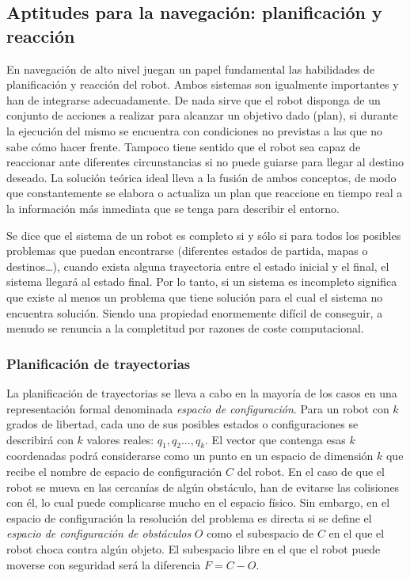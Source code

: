 \subsection{Aptitudes para la navegación: planificación y\\ reacción}
En navegación de alto nivel juegan un papel fundamental las habilidades de planificación y reacción del robot. Ambos sistemas son igualmente importantes y han de integrarse adecuadamente. De nada sirve que el robot disponga de un conjunto de acciones a realizar para alcanzar un objetivo dado (plan), si durante la ejecución del mismo se encuentra con condiciones no previstas a las que no sabe cómo hacer frente. Tampoco tiene sentido que el robot sea capaz de reaccionar ante diferentes circunstancias si no puede guiarse para llegar al destino deseado. La solución teórica ideal lleva a la fusión de ambos conceptos, de modo que constantemente se elabora o actualiza un plan que reaccione en tiempo real a la información más inmediata que se tenga para describir el entorno.

Se dice que el sistema de un robot es completo si y sólo si para todos los posibles problemas que puedan encontrarse (diferentes estados de partida, mapas o destinos\ldots), cuando exista alguna trayectoria entre el estado inicial y el final, el sistema llegará al estado final. Por lo tanto, si un sistema es incompleto significa que existe al menos un problema que tiene solución para el cual el sistema no encuentra solución. Siendo una propiedad enormemente difícil de conseguir, a menudo se renuncia a la completitud por razones de coste computacional.

\subsubsection{Planificación de trayectorias}
La planificación de trayectorias se lleva a cabo en la mayoría de los casos en una representación formal denominada \emph{espacio de configuración}. Para un robot con $k$ grados de libertad, cada uno de sus posibles estados o configuraciones se describirá con $k$ valores reales: $q_{1},q_{2}...,q_{k}$. El vector que contenga esas $k$ coordenadas podrá considerarse como un punto en un espacio de dimensión $k$ que recibe el nombre de espacio de configuración $C$ del robot. En el caso de que el robot se mueva en las cercanías de algún obstáculo, han de evitarse las colisiones con él, lo cual puede complicarse mucho en el espacio físico. Sin embargo, en el espacio de configuración la resolución del problema es directa si se define el \emph{espacio de configuración de obstáculos} $O$ como el subespacio de $C$ en el que el robot choca contra algún objeto. El subespacio libre en el que el robot puede moverse con seguridad será la diferencia $F = C-O$.

